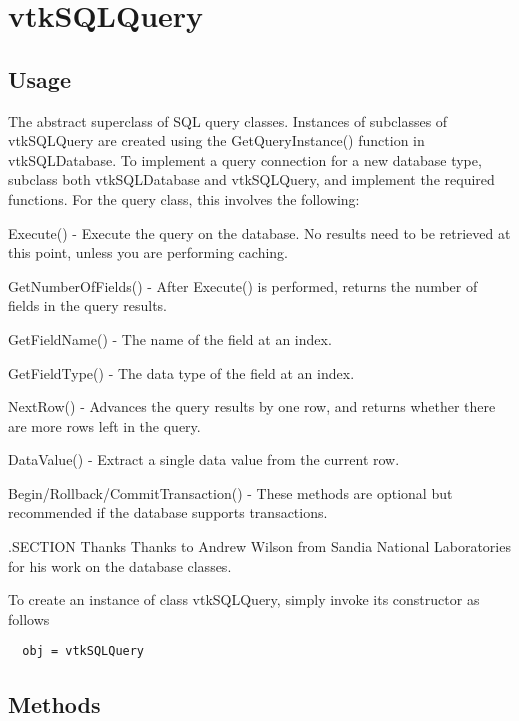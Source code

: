 \section{vtkSQLQuery}

\subsection{Usage}

 The abstract superclass of SQL query classes.  Instances of subclasses
 of vtkSQLQuery are created using the GetQueryInstance() function in
 vtkSQLDatabase.  To implement a query connection for a new database
 type, subclass both vtkSQLDatabase and vtkSQLQuery, and implement the
 required functions.  For the query class, this involves the following:

 Execute() - Execute the query on the database.  No results need to be
             retrieved at this point, unless you are performing caching.

 GetNumberOfFields() - After Execute() is performed, returns the number
                       of fields in the query results.

 GetFieldName() - The name of the field at an index.

 GetFieldType() - The data type of the field at an index.

 NextRow() - Advances the query results by one row, and returns whether
             there are more rows left in the query.

 DataValue() - Extract a single data value from the current row.

 Begin/Rollback/CommitTransaction() - These methods are optional but
 recommended if the database supports transactions.

 .SECTION Thanks
 Thanks to Andrew Wilson from Sandia National Laboratories for his work
 on the database classes.


To create an instance of class vtkSQLQuery, simply
invoke its constructor as follows
\begin{verbatim}
  obj = vtkSQLQuery
\end{verbatim}
\subsection{Methods}

